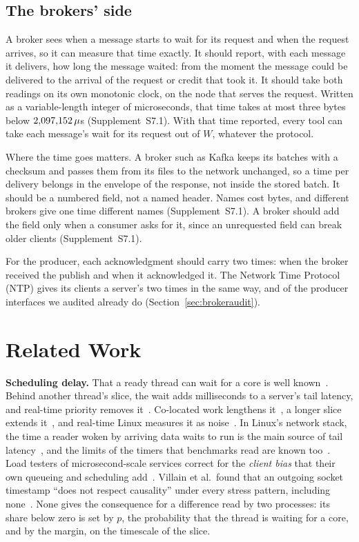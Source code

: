 \documentclass[10pt,journal,compsoc]{IEEEtran}
\newcommand{\kafka}{Kafka}
\begin{document}
\subsection{The brokers' side}
\label{sec:brokerreport}
A broker sees when a message starts to wait for its request and when the request arrives,
so it can measure that time exactly.
It should report, with each message it delivers, how long the message waited: from the moment the
message could be delivered to the arrival of the request or credit that took it. It should take
both readings on its own monotonic clock, on the node that serves the request. Written as a variable-length integer of microseconds, that time takes at most three bytes below $2{,}097{,}152\,\mu$s (Supplement~S7.1). 
With that time reported, every tool can take each message's wait for its request out of $W$,
whatever the protocol.

Where the time goes matters. A broker such as \kafka{} keeps its batches with a checksum and passes
them from its files to the network unchanged, so a time per delivery belongs in the envelope of the response, not
inside the stored batch. It should be a numbered field, not a named header. Names cost bytes, and different brokers give one time different names (Supplement~S7.1). A broker should add the field
only when a consumer asks for it, since an unrequested field can break older clients (Supplement~S7.1).

For the producer, each acknowledgment should carry two times: when the broker received the
publish and when it acknowledged it. The Network Time Protocol (NTP) gives its clients a server's two times in the same way,
and \baHoldModesWord{} of the producer interfaces we audited already do
(Section~\ref{sec:brokeraudit}).

\section{Related Work}
\label{sec:related}

\textbf{Scheduling delay.} That a ready thread can wait for a core is well
known~\cite{gregg2016runqlat}. Behind another thread's slice, the wait adds milliseconds to a
server's tail latency, and real-time priority removes it~\cite{li2014tales}. Co-located work
lengthens it~\cite{leverich2014reconciling}, a longer slice extends it~\cite{jia2024skyloft}, and
real-time Linux measures it as noise~\cite{bristot2023osnoise}. In Linux's network stack, the time
a reader woken by arriving data waits to run is the main source of tail
latency~\cite{zuo2026hoststack}, and the limits of the timers that benchmarks read are known
too~\cite{kuperberg2011timers}. Load testers of microsecond-scale services correct for the
\emph{client bias} that their own queueing and scheduling add~\cite{zhang2016treadmill,kogias2019lancet}.
Villain et al.\ found that an outgoing socket timestamp ``does not respect causality'' under every
stress pattern, including none~\cite{villain2012probing}. None gives the consequence for a
difference read by two processes: its share below zero is set by $p$, the probability that the
thread is waiting for a core, and by the margin, on the timescale of the slice.
\end{document}
